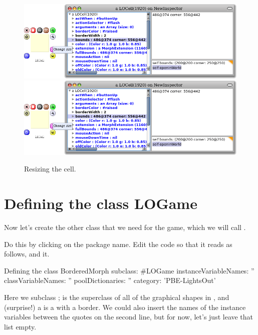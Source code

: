 \documentclass[a4paper,10pt,twoside]{book}
\begin{document}
\begin{figure}[htbp]
\centering
\ifluluelse
	{\includegraphics[width=\textwidth]{LOCellResize} }
	{\includegraphics[scale=0.7]{LOCellResize} }
\caption{Resizing the cell.}
\end{figure}


\section{Defining the class LOGame}

Now let's create the other class that we need for the game, which we will call .

Do this by clicking on the package name.
Edit the code so that it reads as follows, and  it.

\begin{classdef}[sbegame]{Defining the  class}
BorderedMorph subclass: #LOGame
   instanceVariableNames: ''
   classVariableNames: ''
   poolDictionaries: ''
   category: 'PBE-LightsOut'
\end{classdef}

Here we subclass ;  is the superclass of all of the graphical shapes in \pharo, and (surprise!) a  is a  with a border.  
We could also insert the names of the instance variables between the quotes on the second line, but for now, let's just leave that list empty.
\end{document}
